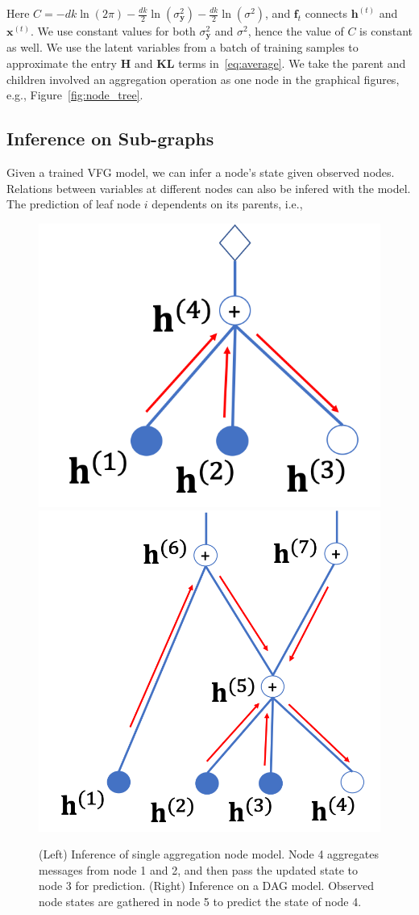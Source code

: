 \documentclass{article} %
\begin{document}
Here $C=-dk\ln(2\pi)-\frac{dk}{2}\ln(\sigma_{\mathbf{y}}^2)-\frac{dk}{2}\ln(\sigma^2)$, and $\mathbf{f}_t$ connects $\mathbf{h}^{(t)}$ and $\mathbf{x}^{(t)}$. We use constant values for both  $\sigma^2_{\mathbf{y}}$ and $\sigma^2$, hence the value of $C$ is constant as well. We use the latent variables from a batch of training samples to approximate the entry \textbf{H} and \textbf{KL} terms in~\eqref{eq:average}. We take the parent and children involved an aggregation operation as one node in the graphical figures, e.g., Figure~\ref{fig:node_tree}. 

\subsection{Inference on Sub-graphs }
Given a trained VFG model, we can infer a node's state given observed nodes. Relations between variables at different nodes  can also be infered with the model. The prediction of leaf node $i$ dependents on its parents, i.e.,
\begin{figure}
\begin{center}
 \includegraphics[width=0.4\linewidth]{fig/two_layer_infer.png}
 \hspace{0.15in}
 \includegraphics[width=0.5\linewidth]{fig/dag_infer.png}
\end{center}
\vspace{-0.2in}
 \caption{{\small (Left) Inference of single aggregation node model. Node 4 aggregates messages from node 1 and 2, and then pass  the updated state to node 3 for prediction. (Right) Inference on a DAG model. Observed node states are gathered in node 5 to predict the state of node 4.}}
\label{fig:two_layer_infer}
\vspace{-0.23in}
\end{figure}
\end{document}
